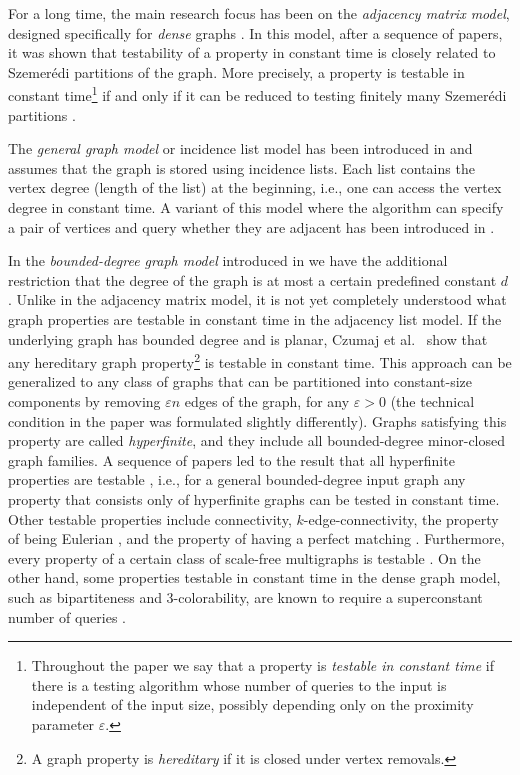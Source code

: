 \documentclass[11pt]{article}
\newcommand{\eps}{\ensuremath{\epsilon}}
\def\epsilon{\ensuremath{\varepsilon}}
\begin{document}
For a long time, the main research focus has been on the \emph{adjacency matrix model}, designed specifically for \emph{dense} graphs \cite{GGR98}. In this model, after a sequence of papers, it was shown that testability of a property in constant time is closely related to Szemer\'{e}di partitions of the graph. More precisely, a property is testable in constant time\footnote{Throughout the paper we say that a property is \emph{testable in constant time} if there is a testing algorithm whose number of queries to the input is independent of the input size, possibly depending only on the proximity parameter $\eps$.} if and only if it can be reduced to testing finitely many Szemer\'{e}di partitions \cite{AFNS06}.

The \emph{general graph model} or incidence list model has been introduced in \cite{PR02} and assumes that the graph is stored using incidence lists. Each list contains the vertex degree (length of the list) at the beginning, i.e., one can access the vertex degree in constant time.
A variant of this model where the algorithm can specify a pair of vertices and query whether they are adjacent has been introduced in \cite{KKR04}.

 In the \emph{bounded-degree graph model} introduced in \cite{GR97} we have the additional restriction that the degree of the graph is at most a certain predefined constant $d$. Unlike in the adjacency matrix model, it is not yet completely understood what graph properties are testable in constant time in the adjacency list model. If the underlying graph has bounded degree and is planar, Czumaj et al.\ \cite{CSS09} show that any hereditary graph property\footnote{A graph property is \emph{hereditary} if it is closed under vertex removals.} is testable in constant time. This approach can be generalized to any class of graphs that can be partitioned into constant-size components by removing $\eps n$ edges of the graph, for any $\eps > 0$ (the technical condition in the paper was formulated slightly differently). Graphs satisfying this property are called \emph{hyperfinite}, and they include all bounded-degree minor-closed graph families.
A sequence of papers \cite{BSS08,HKNO09} led to the result that all hyperfinite properties are testable \cite{NS11}, i.e., for a general bounded-degree input graph
any property that consists only of hyperfinite graphs can be tested in constant time. Other testable properties include connectivity, $k$-edge-connectivity, the property of being Eulerian \cite{GR97}, and the property of having a perfect matching \cite{NO08}. Furthermore, every property of a certain class of scale-free
multigraphs is testable \cite{I16}.
On the other hand, some properties testable in constant time in the dense graph model, such as bipartiteness and 3-colorability, are known to require a superconstant number of queries \cite{BOT02,GR97}.
\end{document}
